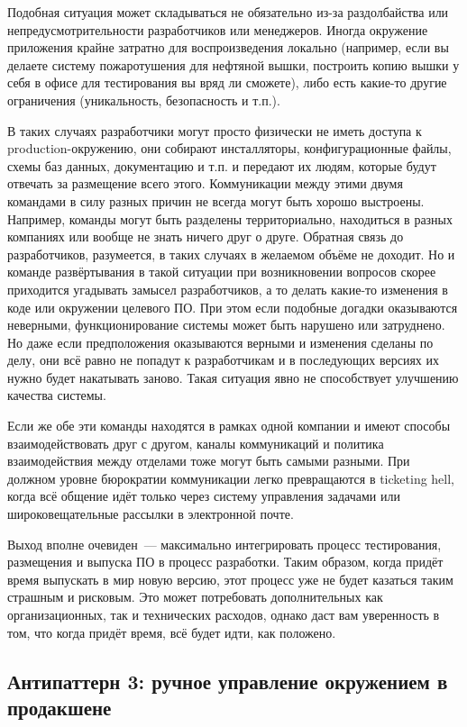 \documentclass{../../text-style}
\begin{document}
Подобная ситуация может складываться не обязательно из-за раздолбайства или непредусмотрительности разработчиков или менеджеров. Иногда окружение приложения крайне затратно для воспроизведения локально (например, если вы делаете систему пожаротушения для нефтяной вышки, построить копию вышки у себя в офисе для тестирования вы вряд ли сможете), либо есть какие-то другие ограничения (уникальность, безопасность и т.п.).

В таких случаях разработчики могут просто физически не иметь доступа к production-окружению, они собирают инсталляторы, конфигурационные файлы, схемы баз данных, документацию и т.п. и передают их людям, которые будут отвечать за размещение всего этого. Коммуникации между этими двумя командами в силу разных причин не всегда могут быть хорошо выстроены. Например, команды могут быть разделены территориально, находиться в разных компаниях или вообще не знать ничего друг о друге. Обратная связь до разработчиков, разумеется, в таких случаях в желаемом объёме не доходит. Но и команде развёртывания в такой ситуации при возникновении вопросов скорее приходится угадывать замысел разработчиков, а то делать какие-то изменения в коде или окружении целевого ПО. При этом если подобные догадки оказываются неверными, функционирование системы может быть нарушено или затруднено. Но даже если предположения оказываются верными и изменения сделаны по делу, они всё равно не попадут к разработчикам и в последующих версиях их нужно будет накатывать заново. Такая ситуация явно не способствует улучшению качества системы.

Если же обе эти команды находятся в рамках одной компании и имеют способы взаимодействовать друг с другом, каналы коммуникаций и политика взаимодействия между отделами тоже могут быть самыми разными. При должном уровне бюрократии коммуникации легко превращаются в ticketing hell, когда всё общение идёт только через систему управления задачами или широковещательные рассылки в электронной почте.

Выход вполне очевиден~--- максимально интегрировать процесс тестирования, размещения и выпуска ПО в процесс разработки. Таким образом, когда придёт время выпускать в мир новую версию, этот процесс уже не будет казаться таким страшным и рисковым. Это может потребовать дополнительных как организационных, так и технических расходов, однако даст вам уверенность в том, что когда придёт время, всё будет идти, как положено.

\subsection{Антипаттерн 3: ручное управление окружением в продакшене}
\end{document}
